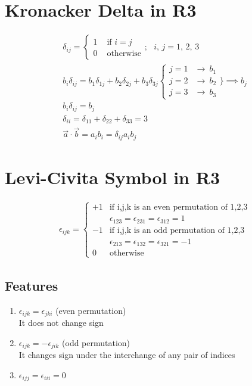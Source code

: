 \documentclass[a4paper, 11pt, normalem]{report}
\begin{document}
\section{Kronacker Delta in R3}
\begin{gather*}
    \delta_{ij} =
    \begin{cases}
        1 & \text{ if } i = j \\
        0 & \text{ otherwise}
    \end{cases}
    ;~~~ i,\,j = 1,\,2,\,3 \\
    b_{i}\delta_{ij} = b_{1}\delta_{1j} + b_{2}\delta_{2j} + b_{3}\delta_{3j}
    \begin{cases}
        j = 1 & \to ~ b_{1} \\
        j = 2 & \to ~ b_{2} \\
        j = 3 & \to ~ b_{3}
    \end{cases}
    \Bigg\} \implies b_{j} \\
    b_{i}\delta_{ij} = b_{j} \\
    \delta_{ii} = \delta_{11} + \delta_{22} + \delta_{33} = 3 \\
    \vec{a} \cdot \vec{b} = a_{i}b_{i} = \delta_{ij}a_{i}b_{j}
\end{gather*}

\section{Levi-Civita Symbol in R3}
\begin{gather*}
    \epsilon_{ijk} =
    \begin{cases}
        +1 & \text{if i,j,k is an even permutation of 1,2,3}       \\
           & \epsilon_{123} = \epsilon_{231} = \epsilon_{312} = 1  \\
        -1 & \text{if i,j,k is an odd permutation of 1,2,3}        \\
           & \epsilon_{213} = \epsilon_{132} = \epsilon_{321} = -1 \\
        0  & \text{otherwise}
    \end{cases}
\end{gather*}
\subsection{Features}
\begin{enumerate}
    \item $\epsilon_{ijk} = \epsilon_{jki}$ (even permutation) \\
          It does not change sign
    \item $\epsilon_{ijk} = -\epsilon_{jik}$ (odd permutation) \\
          It changes sign under the interchange of any pair of indices
    \item $\epsilon_{ijj} = \epsilon_{iii} = 0$
\end{enumerate}
\end{document}
